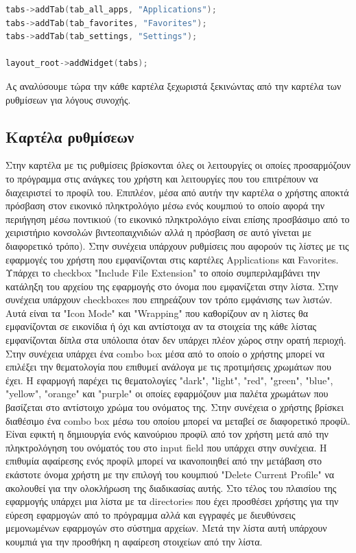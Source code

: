 \begin{lstlisting}[language=C++, style=cppstyle]
tabs->addTab(tab_all_apps, "Applications");
tabs->addTab(tab_favorites, "Favorites");
tabs->addTab(tab_settings, "Settings");

layout_root->addWidget(tabs);
\end{lstlisting}

Ας αναλύσουμε τώρα την κάθε καρτέλα ξεχωριστά ξεκινώντας από την καρτέλα των ρυθμίσεων για
λόγους συνοχής.



\subsection{Καρτέλα ρυθμίσεων}

Στην καρτέλα με τις ρυθμίσεις βρίσκονται όλες οι λειτουργίες οι οποίες προσαρμόζουν το
πρόγραμμα στις ανάγκες του χρήστη και λειτουργίες που του επιτρέπουν να διαχειριστεί το
προφίλ του. Επιπλέον, μέσα από αυτήν την καρτέλα ο χρήστης αποκτά πρόσβαση στον εικονικό
πληκτρολόγιο μέσω ενός κουμπιού το οποίο αφορά την περιήγηση μέσω ποντικιού (το εικονικό
πληκτρολόγιο είναι επίσης προσβάσιμο από το χειριστήριο κονσολών βιντεοπαιχνιδιών αλλά η
πρόσβαση σε αυτό γίνεται με διαφορετικό τρόπο). Στην συνέχεια υπάρχουν ρυθμίσεις που αφορούν
τις λίστες με τις εφαρμογές του χρήστη που εμφανίζονται στις καρτέλες Applications και 
Favorites. Υπάρχει το checkbox "Include File Extension" το οποίο συμπεριλαμβάνει την κατάληξη
του αρχείου της εφαρμογής στο όνομα που εμφανίζεται στην λίστα. Στην συνέχεια υπάρχουν
checkboxes που επηρεάζουν τον τρόπο εμφάνισης των λιστών. Αυτά είναι τα "Icon Mode" και
"Wrapping" που καθορίζουν αν η λίστες θα εμφανίζονται σε εικονίδια ή όχι και αντίστοιχα αν τα στοιχεία
της κάθε λίστας εμφανίζονται δίπλα στα υπόλοιπα όταν δεν υπάρχει πλέον χώρος στην ορατή περιοχή.
Στην συνέχεια υπάρχει ένα combo box μέσα από το οποίο ο χρήστης μπορεί να επιλέξει την
θεματολογία που επιθυμεί ανάλογα με τις προτιμήσεις χρωμάτων που έχει. Η εφαρμογή παρέχει τις
θεματολογίες "dark", "light", "red", "green", "blue", "yellow", "orange" και "purple" οι οποίες
εφαρμόζουν μια παλέτα χρωμάτων που βασίζεται στο αντίστοιχο χρώμα του ονόματος της. Στην συνέχεια
ο χρήστης βρίσκει διαθέσιμο ένα combo box μέσω του οποίου μπορεί να μεταβεί σε διαφορετικό προφίλ.
Είναι εφικτή η δημιουργία ενός καινούριου προφίλ από τον χρήστη μετά από την πληκτρολόγηση του
ονόματός του στο input field που υπάρχει στην συνέχεια. Η επιθυμία αφαίρεσης ενός προφίλ μπορεί να
ικανοποιηθεί από την μετάβαση στο εκάστοτε όνομα χρήστη με την επιλογή του κουμπιού
"Delete Current Profile" να ακολουθεί για την ολοκλήρωση της διαδικασίας αυτής. Στο τέλος του πλαισίου
της εφαρμογής υπάρχει μια λίστα με τα directories που έχει προσθέσει χρήστης για την εύρεση εφαρμογών 
από το πρόγραμμα αλλά και εγγραφές με διευθύνσεις μεμονωμένων εφαρμογών στο σύστημα αρχείων.
Μετά την λίστα αυτή υπάρχουν κουμπιά για την προσθήκη η αφαίρεση στοιχείων από την λίστα.

